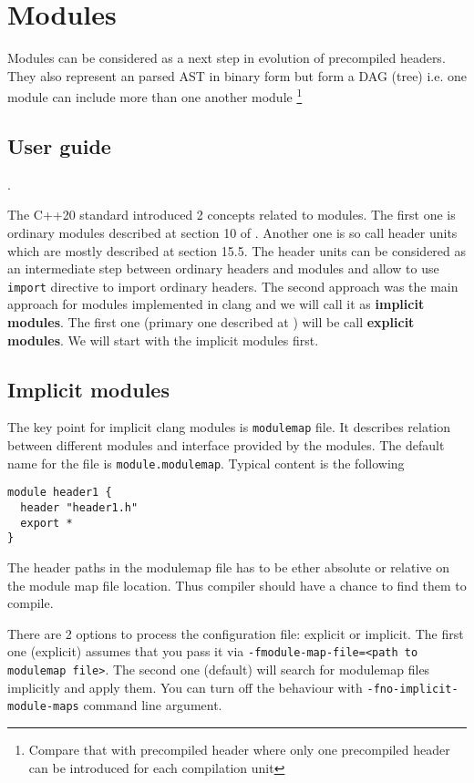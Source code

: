 \section{Modules}
Modules can be considered as a next step in evolution of precompiled
headers. They also represent an parsed AST in binary form but form a
DAG (tree) i.e. one module can include more than one another module
\footnote{Compare that with precompiled header where only one
precompiled header can be introduced for each compilation unit}
\subsection{User guide}.

The C++20 standard \cite{book:ieee_cpp_20} introduced 2 concepts
related to modules. The first one is ordinary modules described at
section 10 of \cite{book:ieee_cpp_20}. Another one is so call header
units   which are mostly described at section 15.5.
The header units can be considered as an intermediate step between
ordinary headers and modules and allow to use
\texttt{import} directive to import ordinary headers. The
second approach was the main approach for modules implemented in clang
and we will call it as \textbf{implicit modules}. The first one (primary one
described at \cite{book:ieee_cpp_20}) will be call \textbf{explicit
  modules}. We will start with the implicit modules first.

\subsection{Implicit modules}
The key point for implicit clang modules is \texttt{modulemap}
file. It describes relation between different modules and interface
provided by the modules. The default name for the file is
\texttt{module.modulemap}. Typical content is the following
\begin{verbatim}
module header1 {
  header "header1.h"
  export *
}
\end{verbatim}
The header paths in the modulemap file has to be ether absolute or
relative on the module map file location. Thus compiler should have a
chance to find them to compile.

There are 2 options to process the configuration file: explicit or
implicit. The first one (explicit) assumes that you pass it via
\texttt{-fmodule-map-file=<path to modulemap file>}. The
second one (default) will search for modulemap files implicitly and
apply them. You can turn off the behaviour with
\texttt{-fno-implicit-module-maps} command line argument.


